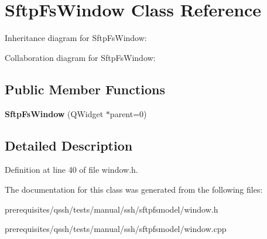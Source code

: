 \hypertarget{class_sftp_fs_window}{}\section{Sftp\+Fs\+Window Class Reference}
\label{class_sftp_fs_window}


Inheritance diagram for Sftp\+Fs\+Window\+:


Collaboration diagram for Sftp\+Fs\+Window\+:
\subsection*{Public Member Functions}
\begin{DoxyCompactItemize}
\item 
\mbox{\label{class_sftp_fs_window_ae3160c085bba1bdac19057e1d23917ec}} 
{\bfseries Sftp\+Fs\+Window} (Q\+Widget $\ast$parent=0)
\end{DoxyCompactItemize}


\subsection{Detailed Description}


Definition at line 40 of file window.\+h.



The documentation for this class was generated from the following files\+:\begin{DoxyCompactItemize}
\item 
prerequisites/qssh/tests/manual/ssh/sftpfsmodel/window.\+h\item 
prerequisites/qssh/tests/manual/ssh/sftpfsmodel/window.\+cpp\end{DoxyCompactItemize}
